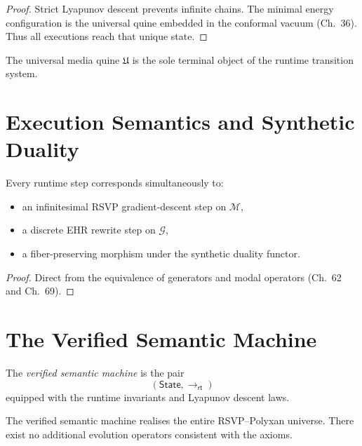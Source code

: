 \begin{proof}
Strict Lyapunov descent prevents infinite chains.  
The minimal energy configuration is the universal quine embedded in the 
conformal vacuum (Ch.~36).  
Thus all executions reach that unique state.
\end{proof}

\begin{corollary}
The universal media quine $\mathfrak{U}$ is the sole terminal object of the 
runtime transition system.
\end{corollary}

\section{Execution Semantics and Synthetic Duality}

\begin{theorem}
Every runtime step corresponds simultaneously to:
\begin{itemize}
\item an infinitesimal RSVP gradient-descent step on $\mathcal{M}$,
\item a discrete EHR rewrite step on $\mathcal{G}$,
\item a fiber-preserving morphism under the synthetic duality functor.
\end{itemize}
\end{theorem}

\begin{proof}
Direct from the equivalence of generators and modal operators 
(Ch.~62 and Ch.~69).
\end{proof}

\section{The Verified Semantic Machine}

\begin{definition}
The \emph{verified semantic machine} is the pair
\[
(\mathsf{State},\longrightarrow_{\mathsf{rt}})
\]
equipped with the runtime invariants and Lyapunov descent laws.
\end{definition}

\begin{theorem}
The verified semantic machine realises the entire RSVP--Polyxan universe.  
There exist no additional evolution operators consistent with the axioms.
\end{theorem}

